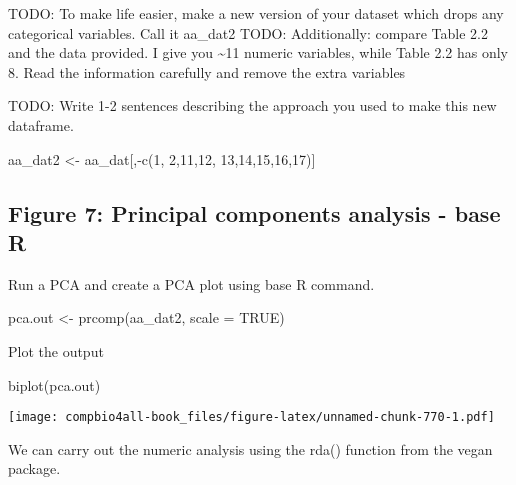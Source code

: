 \documentclass[
]{book}
\newenvironment{Shaded}{\begin{snugshade}}{\end{snugshade}}
\newcommand{\AttributeTok}[1]{\textcolor[rgb]{0.77,0.63,0.00}{#1}}
\newcommand{\ConstantTok}[1]{\textcolor[rgb]{0.00,0.00,0.00}{#1}}
\newcommand{\DecValTok}[1]{\textcolor[rgb]{0.00,0.00,0.81}{#1}}
\newcommand{\FunctionTok}[1]{\textcolor[rgb]{0.00,0.00,0.00}{#1}}
\newcommand{\NormalTok}[1]{#1}
\newcommand{\OtherTok}[1]{\textcolor[rgb]{0.56,0.35,0.01}{#1}}
\newcommand{\SpecialCharTok}[1]{\textcolor[rgb]{0.00,0.00,0.00}{#1}}
\begin{document}
TODO: To make life easier, make a new version of your dataset which drops any categorical variables. Call it aa\_dat2
TODO: Additionally: compare Table 2.2 and the data provided. I give you \textasciitilde11 numeric variables, while Table 2.2 has only 8. Read the information carefully and remove the extra variables

TODO: Write 1-2 sentences describing the approach you used to make this new dataframe.

\begin{Shaded}
\begin{Highlighting}[]
\NormalTok{aa\_dat2 }\OtherTok{\textless{}{-}}\NormalTok{ aa\_dat[,}\SpecialCharTok{{-}}\FunctionTok{c}\NormalTok{(}\DecValTok{1}\NormalTok{,}
                      \DecValTok{2}\NormalTok{,}\DecValTok{11}\NormalTok{,}\DecValTok{12}\NormalTok{,}
                      \DecValTok{13}\NormalTok{,}\DecValTok{14}\NormalTok{,}\DecValTok{15}\NormalTok{,}\DecValTok{16}\NormalTok{,}\DecValTok{17}\NormalTok{)]}
\end{Highlighting}
\end{Shaded}

\hypertarget{figure-7-principal-components-analysis---base-r}{%
\subsection{Figure 7: Principal components analysis - base R}\label{figure-7-principal-components-analysis---base-r}}

Run a PCA and create a PCA plot using base R command.

\begin{Shaded}
\begin{Highlighting}[]
\NormalTok{pca.out }\OtherTok{\textless{}{-}} \FunctionTok{prcomp}\NormalTok{(aa\_dat2, }\AttributeTok{scale =} \ConstantTok{TRUE}\NormalTok{)}
\end{Highlighting}
\end{Shaded}

Plot the output

\begin{Shaded}
\begin{Highlighting}[]
\FunctionTok{biplot}\NormalTok{(pca.out)}
\end{Highlighting}
\end{Shaded}

\texttt{[image: compbio4all-book\_files/figure-latex/unnamed-chunk-770-1.pdf]}

We can carry out the numeric analysis using the rda() function from the vegan package.
\end{document}
